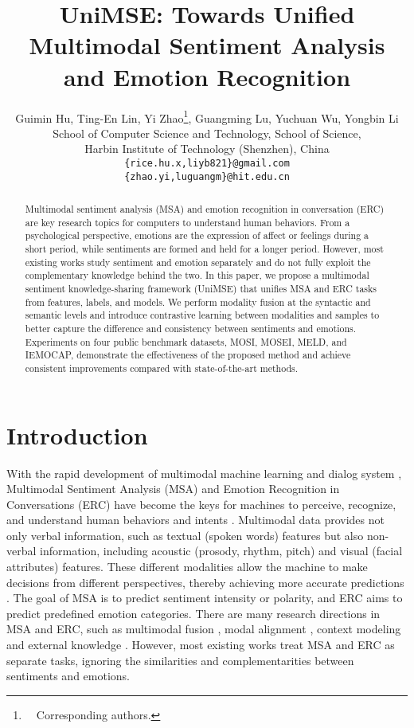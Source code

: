 \documentclass[11pt]{article}
\title{UniMSE: Towards Unified Multimodal Sentiment Analysis \\and Emotion Recognition}
\author{Guimin Hu, Ting-En Lin, Yi Zhao\thanks{\ \ Corresponding authors.}, Guangming Lu, Yuchuan Wu, Yongbin Li  \\
  School of Computer Science and Technology, School of Science, \\ Harbin Institute of Technology (Shenzhen), China \\
  \texttt{\{rice.hu.x,liyb821\}@gmail.com} \\ 
  \texttt{\{zhao.yi,luguangm\}@hit.edu.cn}}
\begin{document}
\maketitle
\begin{abstract}


Multimodal sentiment analysis (MSA) and emotion recognition in conversation (ERC) are key research topics for computers to understand human behaviors. From a psychological perspective, emotions are the expression of affect or feelings during a short period, while sentiments are formed and held for a longer period. However, most existing works study sentiment and emotion separately and do not fully exploit the complementary knowledge behind the two. In this paper, we propose a multimodal sentiment knowledge-sharing framework (UniMSE) that unifies MSA and ERC tasks from features, labels, and models. We perform modality fusion at the syntactic and semantic levels and introduce contrastive learning between modalities and samples to better capture the difference and consistency between sentiments and emotions. Experiments on four public benchmark datasets, MOSI, MOSEI, MELD, and IEMOCAP, demonstrate the effectiveness of the proposed method and achieve consistent improvements compared with state-of-the-art methods.
\end{abstract}

\section{Introduction}

















With the rapid development of multimodal machine learning \cite{liang2022foundations, baltruvsaitis2018multimodal} and dialog system \cite{he2022tree, he2022unified, he2022galaxy}, Multimodal Sentiment Analysis (MSA) and Emotion Recognition in Conversations (ERC) have become the keys for machines to perceive, recognize, and understand human behaviors and intents \cite{Zhang_Xu_Lin_2021, Zhang_Xu_Lin_Lyu_2021, DBLP:conf/emnlp/HuLZ21,DBLP:journals/kbs/HuLZ21}. Multimodal data provides not only verbal information, such as textual (spoken words) features but also non-verbal information, including acoustic (prosody, rhythm, pitch) and visual (facial attributes) features. These different modalities allow the machine to make decisions from different perspectives, thereby achieving more accurate predictions \cite{DBLP:conf/icml/NgiamKKNLN11}. The goal of MSA is to predict sentiment intensity or polarity, and ERC aims to predict predefined emotion categories. There are many research directions in MSA and ERC, such as multimodal fusion \cite{DBLP:conf/naacl/YangWYZRZPM21}, modal alignment \cite{DBLP:conf/acl/TsaiBLKMS19}, context modeling \cite{DBLP:conf/emnlp/Mao0WGL21} and external knowledge \cite{DBLP:conf/emnlp/GhosalMGMP20}. However, most existing works treat MSA and ERC as separate tasks, ignoring the similarities and complementarities between sentiments and emotions. 
\end{document}
